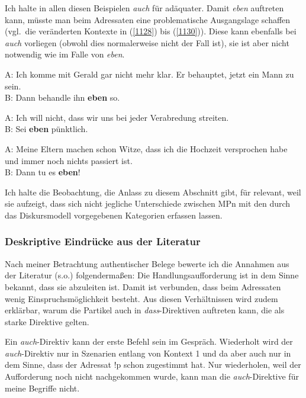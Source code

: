 Ich halte in allen diesen Beispielen \textit{auch} für adäquater. Damit \textit{eben} auftreten kann, müsste man beim Adressaten eine problematische Ausgangslage schaffen (vgl.\ die veränderten Kontexte in (\ref{1128}) bis (\ref{1130})). Diese kann ebenfalls bei \textit{auch} vorliegen (obwohl dies normalerweise nicht der Fall ist), sie ist aber nicht notwendig wie im Falle von \textit{eben}.

\begin{exe}
	\ex\label{1128} 
	A: Ich komme mit Gerald gar nicht mehr klar. Er behauptet, jetzt ein Mann zu sein. \\
	B: Dann behandle ihn \textbf{eben} so.
\end{exe}

\begin{exe}
	\ex\label{1129} 
	A: Ich will nicht, dass wir uns bei jeder Verabredung streiten.\\
	B: Sei \textbf{eben} pünktlich.
\end{exe}
		
\begin{exe}
	\ex\label{1130} 
	A: Meine Eltern machen schon Witze, dass ich die Hochzeit versprochen habe und immer noch nichts passiert ist.\\
	B: Dann tu es \textbf{eben}!
\end{exe}
Ich halte die Beobachtung, die Anlass zu diesem Abschnitt gibt, für relevant, weil sie aufzeigt, dass sich nicht jegliche Unterschiede zwischen MPn mit den durch das Diskursmodell vorgegebenen Kategorien erfassen lassen.

\subsubsection{Deskriptive Eindrücke aus der Literatur}
Nach meiner Betrachtung authentischer Belege bewerte ich die Annahmen aus der Literatur (s.o.) folgendermaßen: Die Handlungsaufforderung ist in dem Sinne bekannt, dass sie abzuleiten ist. Damit ist verbunden, dass beim Adressaten wenig Einspruchsmöglichkeit besteht. Aus diesen Verhältnissen wird zudem er\-klärbar, warum die Partikel auch in \textit{dass}-Direktiven auftreten kann, die als starke Direktive gelten.

Ein \textit{auch}-Direktiv kann der erste Befehl sein im Gespräch. Wiederholt wird der \textit{auch}-Direktiv nur in Szenarien entlang von Kontext 1 und da aber auch nur in dem Sinne, dass der Adressat !p schon zugestimmt hat. Nur wiederholen, weil der Aufforderung noch nicht nachgekommen wurde, kann man die \textit{auch}-Direktive für meine Begriffe nicht.

